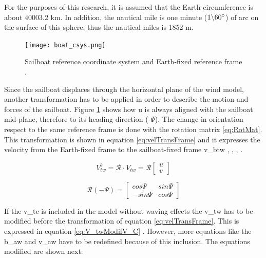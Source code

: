 For the purposes of this research, it is assumed that the Earth circumference is about 40003.2 km. In addition, the nautical mile is one minute (\textit{$1 \backslash 60 \degree$}) of arc on the surface of this sphere, thus the nautical miles is 1852 m. \par 
   
\begin{figure}[hbt!]
    \centering
    \texttt{[image: boat\_csys.png]}
    \caption{Sailboat reference coordinate system and Earth-fixed reference frame \cite{keuning2004mathematical}. }
    \label{fig:boat_Csys}
\end{figure}

Since the sailboat displaces through the horizontal plane of the wind model, another transformation has to be applied in order to describe the motion and forces of the sailboat. Figure \ref{fig:boat_Csys} shows how \acrshort{u} is always aligned with the sailboat mid-plane, therefore to its heading direction (-$\Psi$). The change in orientation respect to the same reference frame is done with the rotation matrix \ref{eq:RotMat}. This transformation is shown in equation \ref{eq:velTransFrame} and it expresses the velocity from the Earth-fixed frame to the sailboat-fixed frame \acrshort{v_btw} \cite{yang2011control}, \cite{bohm2014velocity}, \cite{Alves2014ASailboat}, \cite{keuning2004mathematical}.\par 
\begin{equation}\label{eq:velTransFrame}
    V_{tw}^b= \mathcal{R} \cdot V_{tw}= \mathcal{R}
    \begin{bmatrix}
    u\\
    v
    \end{bmatrix}
\end{equation}

\begin{equation} \label{eq:RotMat}
    \mathcal{R}(- \Psi)=
    \begin{bmatrix}
    cos \Psi & sin\Psi \\
    -sin \Psi & cos \Psi
    \end{bmatrix}
\end{equation}

If the \acrshort{v_tc} is included in the model without waving effects the \acrshort{v_tw} has to be modified before the transformation of equation \ref{eq:velTransFrame}. This is expressed in equation \ref{eq:V_twModifV_C} \cite{allsopp1998stochastic}. However, more equations like the \acrshort{b_aw} and \acrshort{v_aw} have to be redefined because of this inclusion. The equations modified are shown next:\par

